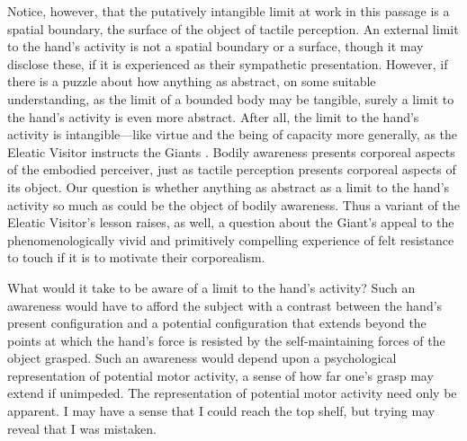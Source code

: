 Notice, however, that the putatively intangible limit at work in this passage is a spatial boundary, the surface of the object of tactile perception. An external limit to the hand's activity is not a spatial boundary or a surface, though it may disclose these, if it is experienced as their sympathetic presentation. However, if there is a puzzle about how anything as abstract, on some suitable understanding, as the limit of a bounded body may be tangible, surely a limit to the hand's activity is even more abstract. After all, the limit to the hand's activity is intangible---like virtue and the being of capacity more generally, as the Eleatic Visitor instructs the Giants \citep[chapter 1]{Beere:2009vn}. Bodily awareness presents corporeal aspects of the embodied perceiver, just as tactile perception presents corporeal aspects of its object. Our question is whether anything as abstract as a limit to the hand's activity so much as could be the object of bodily awareness. Thus a variant of the Eleatic Visitor's lesson raises, as well, a question about the Giant's appeal to the phenomenologically vivid and primitively compelling experience of felt resistance to touch if it is to motivate their corporealism.

What would it take to be aware of a limit to the hand's activity? Such an awareness would have to afford the subject with a contrast between the hand's present configuration and a potential configuration that extends beyond the points at which the hand's force is resisted by the self-maintaining forces of the object grasped. Such an awareness would depend upon a psychological representation of potential motor activity, a sense of how far one's grasp may extend if unimpeded. The representation of potential motor activity need only be apparent. I may have a sense that I could reach the top shelf, but trying may reveal that I was mistaken.

